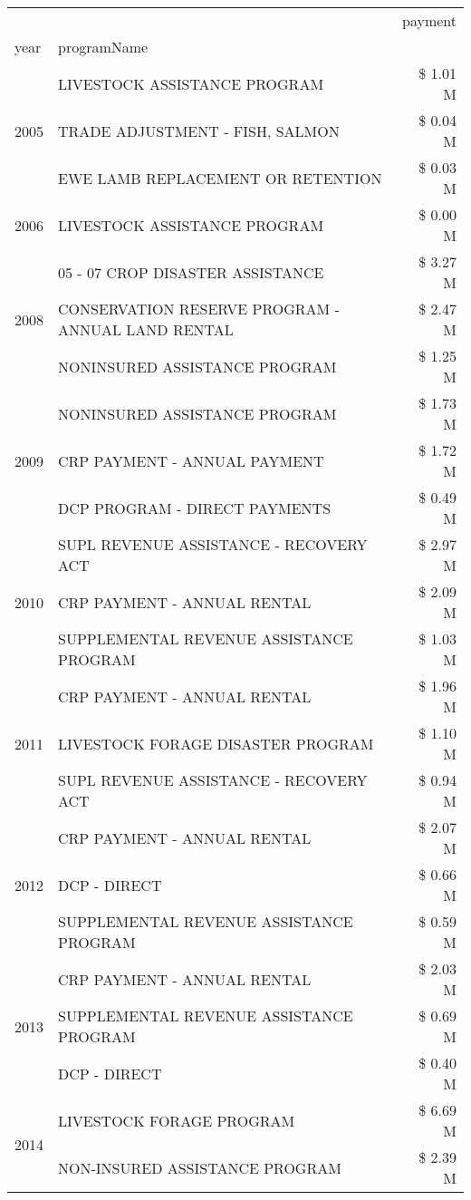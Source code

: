 \begin{tabular}{llr}
\toprule
 &  & payment \\
year & programName &  \\
\midrule
\multirow[t]{3}{*}{2005} & LIVESTOCK ASSISTANCE PROGRAM & \$ 1.01 M \\
 & TRADE ADJUSTMENT - FISH, SALMON & \$ 0.04 M \\
 & EWE LAMB REPLACEMENT OR RETENTION & \$ 0.03 M \\
\cline{1-3}
2006 & LIVESTOCK ASSISTANCE PROGRAM & \$ 0.00 M \\
\cline{1-3}
\multirow[t]{3}{*}{2008} & 05 - 07 CROP DISASTER ASSISTANCE & \$ 3.27 M \\
 & CONSERVATION RESERVE PROGRAM - ANNUAL LAND RENTAL & \$ 2.47 M \\
 & NONINSURED ASSISTANCE PROGRAM & \$ 1.25 M \\
\cline{1-3}
\multirow[t]{3}{*}{2009} & NONINSURED ASSISTANCE PROGRAM & \$ 1.73 M \\
 & CRP PAYMENT - ANNUAL PAYMENT & \$ 1.72 M \\
 & DCP PROGRAM - DIRECT PAYMENTS & \$ 0.49 M \\
\cline{1-3}
\multirow[t]{3}{*}{2010} & SUPL REVENUE ASSISTANCE - RECOVERY ACT & \$ 2.97 M \\
 & CRP PAYMENT - ANNUAL RENTAL & \$ 2.09 M \\
 & SUPPLEMENTAL REVENUE ASSISTANCE PROGRAM & \$ 1.03 M \\
\cline{1-3}
\multirow[t]{3}{*}{2011} & CRP PAYMENT - ANNUAL RENTAL & \$ 1.96 M \\
 & LIVESTOCK FORAGE DISASTER PROGRAM & \$ 1.10 M \\
 & SUPL REVENUE ASSISTANCE - RECOVERY ACT & \$ 0.94 M \\
\cline{1-3}
\multirow[t]{3}{*}{2012} & CRP PAYMENT - ANNUAL RENTAL & \$ 2.07 M \\
 & DCP - DIRECT & \$ 0.66 M \\
 & SUPPLEMENTAL REVENUE ASSISTANCE PROGRAM & \$ 0.59 M \\
\cline{1-3}
\multirow[t]{3}{*}{2013} & CRP PAYMENT - ANNUAL RENTAL & \$ 2.03 M \\
 & SUPPLEMENTAL REVENUE ASSISTANCE PROGRAM & \$ 0.69 M \\
 & DCP - DIRECT & \$ 0.40 M \\
\cline{1-3}
\multirow[t]{3}{*}{2014} & LIVESTOCK FORAGE PROGRAM & \$ 6.69 M \\
 & NON-INSURED ASSISTANCE PROGRAM & \$ 2.39 M \\

\end{tabular}

